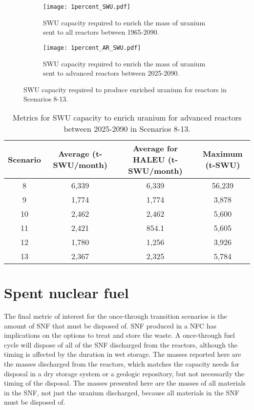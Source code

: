 \begin{figure}[h!]
    \centering
    \begin{subfigure}[b]{0.45\textwidth}
        \centering
        \texttt{[image: 1percent\_SWU.pdf]}
        \caption{\gls{SWU} capacity required to enrich the mass of 
        uranium sent to all reactors between 1965-2090.}
        \label{fig:1percent_all_SWU}
    \end{subfigure}
    \hfill
    \begin{subfigure}[b]{0.45\textwidth}
        \centering
        \texttt{[image: 1percent\_AR\_SWU.pdf]}
        \caption{\gls{SWU} capacity required to enrich the mass of 
        uranium sent to advanced reactors between 2025-2090.}
        \label{fig:1percent_AR_SWU}
    \end{subfigure}
       \caption{\gls{SWU} capacity required to produce enriched uranium 
       for reactors in Scenarios 8-13.}
       \label{fig:1percent_swu}
\end{figure}

\begin{table}[h!]
    \centering 
    \caption{Metrics for \gls{SWU} capacity to enrich uranium for 
    advanced reactors between 2025-2090 in Scenarios 8-13.}
    \label{tab:1percent_swu}
    \begin{tabular}{c c c c}
        \hline
        Scenario & Average (t-SWU/month) & Average  
        for \gls{HALEU} (t-SWU/month) & Maximum (t-SWU)\\\hline
        8 & 6,339 & 6,339 & 56,239 \\
        9 & 1,774 & 1,774 & 3,878\\
        10 & 2,462 & 2,462 & 5,600\\
        11 & 2,421 & 854.1 & 5,605\\
        12 & 1,780 & 1,256 & 3,926\\
        13 & 2,367 & 2,325 & 5,784\\
        \hline
    \end{tabular}
\end{table}

\section{Spent nuclear fuel}
The final metric of interest for the once-through transition scenarios is 
the amount of \gls{SNF} that must be disposed of.
\gls{SNF} produced in a \gls{NFC} has implications on the options 
to treat and store the waste. A once-through fuel cycle will dispose of 
all of the \gls{SNF} discharged from the reactors, although 
the timing is affected by the duration in wet storage. The masses 
reported here are the masses discharged from the reactors, which 
matches the capacity needs for disposal in a dry storage system or a 
geologic repository, but not necessarily the timing of the disposal.
The masses 
presented here are the masses of all materials in the \gls{SNF}, not just 
the uranium discharged, because all materials in the \gls{SNF} must be 
disposed of. 

